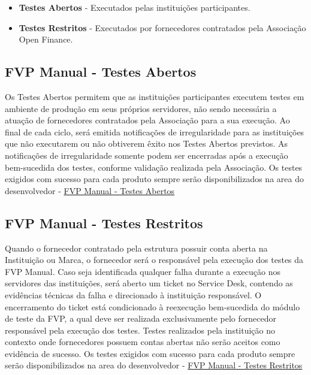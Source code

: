 \begin{itemize}
    \item \textbf{Testes Abertos} -  Executados pelas instituições participantes.
    
    \item \textbf{Testes Restritos} - Executados por fornecedores contratados pela Associação Open Finance.
\end{itemize}

\subsection{FVP Manual - Testes Abertos}

Os Testes Abertos permitem que as instituições participantes executem testes em ambiente de produção em seus próprios servidores, não sendo necessária a atuação de fornecedores contratados pela Associação para a sua execução.
\medskip
Ao final de cada ciclo, será emitida notificações de irregularidade para as instituições que não executarem ou não obtiverem êxito nos Testes Abertos previstos.
As notificações de irregularidade somente podem ser encerradas após a execução bem-sucedida dos testes, conforme validação realizada pela Associação.
\medskip
Os testes exigidos com sucesso para cada produto sempre serão disponibilizados na area do desenvolvedor - \href{https://openfinancebrasil.atlassian.net/wiki/spaces/OF/pages/553255015/FVP+Manual#2---FVP-Manual---Testes-Abertos}{FVP Manual - Testes Abertos}

\subsection{FVP Manual - Testes Restritos}

Quando o fornecedor contratado pela estrutura possuir conta aberta na Instituição ou Marca, o fornecedor será o responsável pela execução dos testes da FVP Manual.
\medskip
Caso seja identificada qualquer falha durante a execução nos servidores das instituições, será aberto um ticket no Service Desk, contendo as evidências técnicas da falha e direcionado à instituição responsável.
\medskip
O encerramento do ticket está condicionado à reexecução bem-sucedida do módulo de teste da FVP, a qual deve ser realizada exclusivamente pelo fornecedor responsável pela execução dos testes.
\medskip
Testes realizados pela instituição no contexto onde fornecedores possuem contas abertas não serão aceitos como evidência de sucesso. 
\medskip
Os testes exigidos com sucesso para cada produto sempre serão disponibilizados na area do desenvolvedor - \href{https://openfinancebrasil.atlassian.net/wiki/spaces/OF/pages/553255015/FVP+Manual#3---FVP-Manual---Testes-Restritos}{FVP Manual - Testes Restritos}

